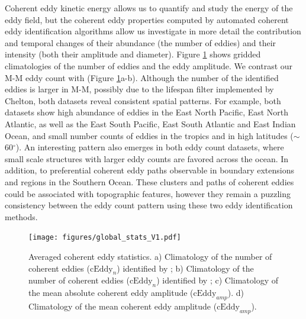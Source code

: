 \documentclass[draft,linenumbers]{agujournal2019}
\newcommand{\cEddy}{\textrm{cEddy}}
\begin{document}
	Coherent eddy kinetic energy allows us to quantify and study the energy of the eddy field, but the coherent eddy properties computed by automated coherent eddy identification algorithms allow us investigate in more detail the contribution and temporal changes of their abundance (the number of eddies) and their intensity (both their amplitude and diameter). 
	Figure \ref{fig:eddy_stats_climatology} shows gridded climatologies of the number of eddies and the eddy amplitude. 
	We contrast our M-M eddy count with \citet{Chelton_Global_2007} (Figure \ref{fig:eddy_stats_climatology}a-b). Although the number of the identified eddies is larger in M-M, possibly due to the lifespan filter implemented by Chelton, both datasets reveal consistent spatial patterns. 
	For example, both datasets show high abundance of eddies in the East North Pacific, East North Atlantic, as well as the East South Pacific, East South Atlantic and East Indian Ocean, and small number counts of eddies in the tropics and in high latitudes ($\sim$60$^\circ$). 
	An interesting pattern also emerges in both eddy count datasets, where small scale structures with larger eddy counts are favored across the ocean. In addition, to preferential coherent eddy paths observable in boundary extensions and regions in the Southern Ocean. 
	These clusters and paths of coherent eddies could be associated with topographic features, however they remain a puzzling consistency between the eddy count pattern using these two eddy identification methods.
	
	\begin{figure}
	    \centering
	    \texttt{[image: figures/global\_stats\_V1.pdf]}
	    \caption{Averaged coherent eddy statistics. a) Climatology of the number of coherent eddies ($\cEddy_n$) identified by \citet{Chelton_Global_2007};  b) Climatology of the number of coherent eddies ($\cEddy_n$) identified by \citet{Martinez_TKE_2019}; c) Climatology of the mean absolute coherent eddy amplitude ($\cEddy_{amp}$). d) Climatology of the mean coherent eddy amplitude ($\cEddy_{amp}$).}
	    \label{fig:eddy_stats_climatology}
	\end{figure}
	
\end{document}
